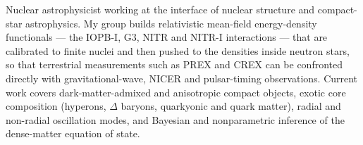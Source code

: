 
Nuclear astrophysicist working at the interface of nuclear structure and
compact-star astrophysics. My group builds relativistic mean-field
energy-density functionals --- the IOPB-I, G3, NITR and NITR-I interactions ---
that are calibrated to finite nuclei and then pushed to the densities inside
neutron stars, so that terrestrial measurements such as PREX and CREX can be
confronted directly with gravitational-wave, NICER and pulsar-timing
observations. Current work covers dark-matter-admixed and anisotropic compact
objects, exotic core composition (hyperons, $\Delta$ baryons, quarkyonic and
quark matter), radial and non-radial oscillation modes, and Bayesian and
nonparametric inference of the dense-matter equation of state.


\vspace{2pt}

